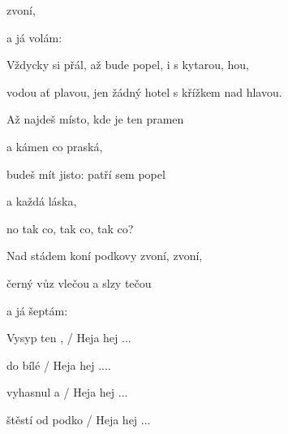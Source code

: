 

\zs
{}    zvoní,

   

a já volám:
\ks

\zs
{}
\ks

\zs
Vždycky si přál, až bude popel, i s kytarou, hou,

vodou ať plavou, jen žádný hotel s křížkem nad hlavou.
\ks

\zs
Až najdeš místo, kde je ten pramen

a kámen co praská,

budeš mít jisto: patří sem popel

a každá láska,

no tak co, tak co, tak co?
\ks

\zs
Nad stádem koní podkovy zvoní, zvoní,

černý vůz vlečou a slzy tečou

a já šeptám:
\ks

\zs
{}
\ks

\zs
Vysyp ten ,  / Heja hej ...

do bílé   / Heja hej ....

vyhasnul  a   / Heja hej ...

štěstí od podko / Heja hej ...
\ks

\kp
